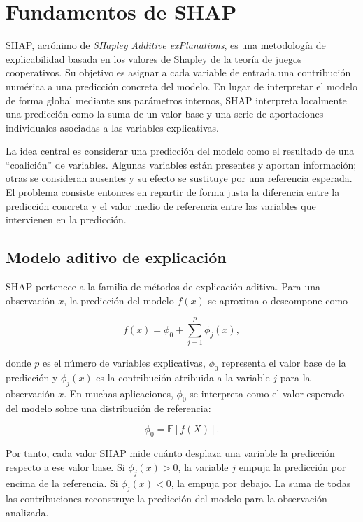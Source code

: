 
\chapter{Fundamentos de SHAP}
\label{app:shap}

SHAP, acrónimo de \emph{SHapley Additive exPlanations}, es una metodología de explicabilidad basada en los valores de Shapley de la teoría de juegos cooperativos. Su objetivo es asignar a cada variable de entrada una contribución numérica a una predicción concreta del modelo. En lugar de interpretar el modelo de forma global mediante sus parámetros internos, SHAP interpreta localmente una predicción como la suma de un valor base y una serie de aportaciones individuales asociadas a las variables explicativas.

La idea central es considerar una predicción del modelo como el resultado de una ``coalición'' de variables. Algunas variables están presentes y aportan información; otras se consideran ausentes y su efecto se sustituye por una referencia esperada. El problema consiste entonces en repartir de forma justa la diferencia entre la predicción concreta y el valor medio de referencia entre las variables que intervienen en la predicción.

\section{Modelo aditivo de explicación}

SHAP pertenece a la familia de métodos de explicación aditiva. Para una observación \(x\), la predicción del modelo \(f(x)\) se aproxima o descompone como

\begin{equation}
f(x) =
\phi_0 + \sum_{j=1}^{p} \phi_j(x),
\label{eq:shap-additive}
\end{equation}

donde \(p\) es el número de variables explicativas, \(\phi_0\) representa el valor base de la predicción y \(\phi_j(x)\) es la contribución atribuida a la variable \(j\) para la observación \(x\). En muchas aplicaciones, \(\phi_0\) se interpreta como el valor esperado del modelo sobre una distribución de referencia:

\begin{equation}
\phi_0 = \mathbb{E}[f(X)].
\label{eq:shap-base-value}
\end{equation}

Por tanto, cada valor SHAP mide cuánto desplaza una variable la predicción respecto a ese valor base. Si \(\phi_j(x) > 0\), la variable \(j\) empuja la predicción por encima de la referencia. Si \(\phi_j(x) < 0\), la empuja por debajo. La suma de todas las contribuciones reconstruye la predicción del modelo para la observación analizada.


